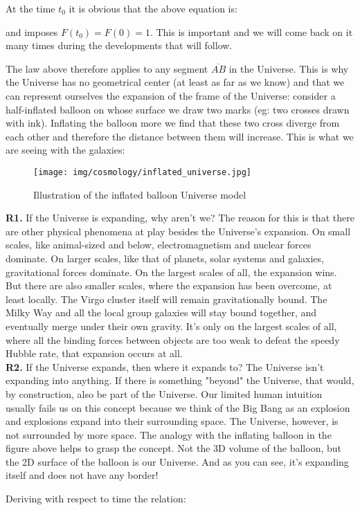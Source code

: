 	\begin{tcolorbox}[title=Remark,colframe=black,arc=10pt]
	At the time $t_0$ it is obvious that the above equation is:
	
	and imposes $F(t_0)=F(0)=1$. This is important and we will come back on it many times during the developments that will follow.
	\end{tcolorbox}
	The law above therefore applies to any segment $\overline{AB}$ in the Universe. This is why the Universe has no geometrical center (at least as far as we know) and that we can represent ourselves the expansion of the frame of the Universe: consider a half-inflated balloon on whose surface we draw two marks (eg: two crosses drawn with ink). Inflating the balloon more we find that these two cross diverge from each other and therefore the distance between them will increase. This is what we are seeing with the galaxies:
	\begin{figure}[H]
		\centering
		\texttt{[image: img/cosmology/inflated\_universe.jpg]}	
		\caption{Illustration of the inflated balloon Universe model}
	\end{figure}
	\begin{tcolorbox}[title=Remarks,colframe=black,arc=10pt]
	\textbf{R1.} If the Universe is expanding, why aren't we? The reason for this is that there are other physical phenomena at play besides the Universe's expansion. On small scales, like animal-sized and below, electromagnetism and nuclear forces dominate. On larger scales, like that of planets, solar systems and galaxies, gravitational forces dominate. On the largest scales of all, the expansion wins. But there are also smaller scales, where the expansion has been overcome, at least locally. The Virgo cluster itself will remain gravitationally bound. The Milky Way and all the local group galaxies will stay bound together, and eventually merge under their own gravity. It's only on the largest scales of all, where all the binding forces between objects are too weak to defeat the speedy Hubble rate, that expansion occurs at all.\\
	
	\textbf{R2.} If the Universe expands, then where it expands to? The Universe isn't expanding into anything. If there is something "beyond" the Universe, that would, by construction, also be part of the Universe. Our limited human intuition usually fails us on this concept because we think of the Big Bang as an explosion and explosions expand into their surrounding space. The Universe, however, is not surrounded by more space. The analogy with the inflating balloon in the figure above helps to grasp the concept. Not the 3D volume of the balloon, but the 2D surface of the balloon is our Universe. And as you can see, it's expanding itself and does not have any border!
	\end{tcolorbox}
	Deriving with respect to time the relation:
	
